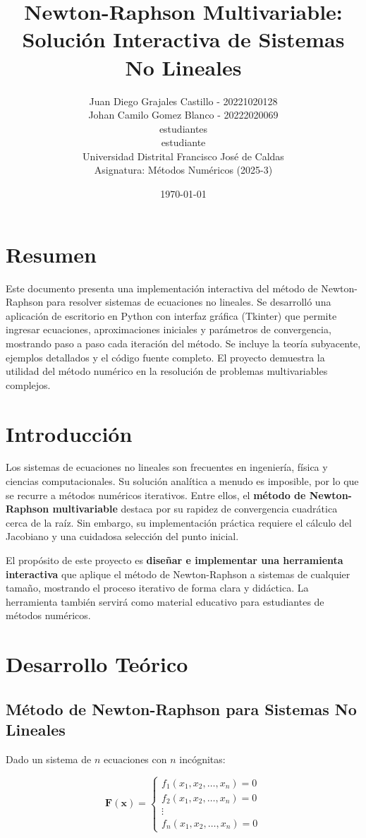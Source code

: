 \documentclass[12pt, letterpaper]{article}
\title{\textbf{Newton-Raphson Multivariable: Solución Interactiva de Sistemas No Lineales}}
\author{Juan Diego Grajales Castillo - 20221020128 \\ Johan Camilo Gomez Blanco - 20222020069 \\ estudiantes \\ estudiante \\ Universidad Distrital Francisco José de Caldas \\ Asignatura: Métodos Numéricos (2025-3)}
\date{\today}
\begin{document}
\maketitle

\section*{Resumen}
Este documento presenta una implementación interactiva del método de Newton-Raphson para resolver sistemas de ecuaciones no lineales. Se desarrolló una aplicación de escritorio en Python con interfaz gráfica (Tkinter) que permite ingresar ecuaciones, aproximaciones iniciales y parámetros de convergencia, mostrando paso a paso cada iteración del método. Se incluye la teoría subyacente, ejemplos detallados y el código fuente completo. El proyecto demuestra la utilidad del método numérico en la resolución de problemas multivariables complejos.

\section{Introducción}
Los sistemas de ecuaciones no lineales son frecuentes en ingeniería, física y ciencias computacionales. Su solución analítica a menudo es imposible, por lo que se recurre a métodos numéricos iterativos. Entre ellos, el \textbf{método de Newton-Raphson multivariable} destaca por su rapidez de convergencia cuadrática cerca de la raíz. Sin embargo, su implementación práctica requiere el cálculo del Jacobiano y una cuidadosa selección del punto inicial.

El propósito de este proyecto es \textbf{diseñar e implementar una herramienta interactiva} que aplique el método de Newton-Raphson a sistemas de cualquier tamaño, mostrando el proceso iterativo de forma clara y didáctica. La herramienta también servirá como material educativo para estudiantes de métodos numéricos.

\section{Desarrollo Teórico}
\subsection{Método de Newton-Raphson para Sistemas No Lineales}
Dado un sistema de $n$ ecuaciones con $n$ incógnitas:

\[
\mathbf{F}(\mathbf{x}) = 
\begin{cases}
f_1(x_1, x_2, \dots, x_n) = 0 \\
f_2(x_1, x_2, \dots, x_n) = 0 \\
\vdots \\
f_n(x_1, x_2, \dots, x_n) = 0
\end{cases}
\]
\end{document}
